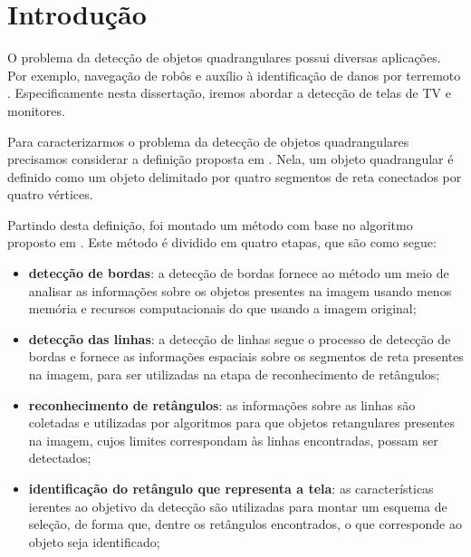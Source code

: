 \section{Introdução}

O problema da detecção de objetos quadrangulares \cite{objquadrangular} possui diversas aplicações. Por exemplo, navegação de robôs \cite{navegrobo} e auxílio à identificação de danos por terremoto \cite{terremoto}. Especificamente nesta dissertação, iremos abordar a detecção de telas de TV e monitores. %

Para caracterizarmos o problema da detecção de objetos quadrangulares precisamos considerar a definição proposta em \cite{objquadrangular}. Nela, um objeto quadrangular é definido como um objeto delimitado por quatro segmentos de reta conectados por quatro vértices.

Partindo desta definição, foi montado um método com base no algoritmo proposto em \cite{mrf}. Este método é dividido em quatro etapas, que são como segue:

\begin{itemize}
 \item \textbf{detecção de bordas}: a detecção de bordas fornece ao método um meio de analisar as informações sobre os objetos presentes na imagem usando menos memória e recursos computacionais do que usando a imagem original;%
 \item \textbf{detecção das linhas}: a detecção de linhas segue o processo de detecção de bordas e fornece as informações espaciais sobre os segmentos de reta presentes na imagem, para ser utilizadas na etapa de reconhecimento de retângulos;%
 \item \textbf{reconhecimento de retângulos}: as informações sobre as linhas são coletadas e utilizadas por algoritmos para que objetos retangulares presentes na imagem, cujos limites correspondam às linhas encontradas, possam ser detectados;%
 \item \textbf{identificação do retângulo que representa a tela}: as características ierentes ao objetivo da detecção são utilizadas para montar um esquema de seleção, de forma que, dentre os retângulos encontrados, o que corresponde ao objeto seja identificado;%
\end{itemize}


